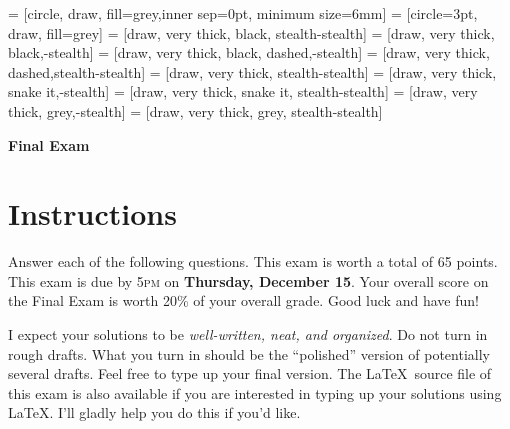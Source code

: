 \documentclass[11pt]{article}
\theoremstyle{definition}
\begin{document}
 = [circle, draw, fill=grey,inner sep=0pt, minimum size=6mm]
 = [circle=3pt, draw, fill=grey]
 = [draw, very  thick, black, stealth-stealth]
 = [draw, very  thick, black,-stealth]
 = [draw, very  thick, black, dashed,-stealth]
 = [draw, very thick, dashed,stealth-stealth]
 = [draw, very thick, stealth-stealth]
 = [draw, very thick, snake it,-stealth]
 = [draw, very thick, snake it, stealth-stealth]
 = [draw, very thick, grey,-stealth]
 = [draw, very thick, grey, stealth-stealth]

\begin{center}

{\Large\bf Final Exam}

\bigskip

  
  \bigskip
  

\end{center}

\section*{Instructions}

Answer each of the following questions. This exam is worth a total of 65 points.  This exam is due by 5\textsc{pm} on \textbf{Thursday, December 15}. Your overall score on the Final Exam is worth 20\% of your overall grade. Good luck and have fun!

\bigskip

I expect your solutions to be \emph{well-written, neat, and organized}.  Do not turn in rough drafts.  What you turn in should be the ``polished'' version of potentially several drafts.  Feel free to type up your final version.  The \LaTeX\ source file of this exam is also available if you are interested in typing up your solutions using \LaTeX.  I'll gladly help you do this if you'd like.

\bigskip
\end{document}
